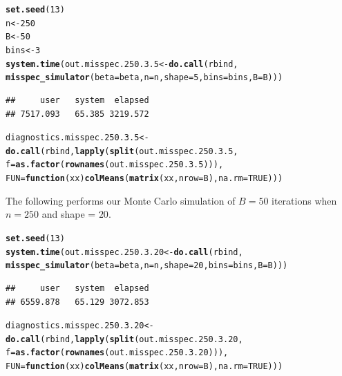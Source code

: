 \documentclass[11pt]{article}\usepackage[]{graphicx}\usepackage[]{color}
\makeatletter
\newcommand{\hlnum}[1]{\textcolor[rgb]{0.686,0.059,0.569}{#1}}%
\newcommand{\hlstd}[1]{\textcolor[rgb]{0.345,0.345,0.345}{#1}}%
\newcommand{\hlkwa}[1]{\textcolor[rgb]{0.161,0.373,0.58}{\textbf{#1}}}%
\newcommand{\hlkwb}[1]{\textcolor[rgb]{0.69,0.353,0.396}{#1}}%
\newcommand{\hlkwc}[1]{\textcolor[rgb]{0.333,0.667,0.333}{#1}}%
\newcommand{\hlkwd}[1]{\textcolor[rgb]{0.737,0.353,0.396}{\textbf{#1}}}%
\newenvironment{kframe}{%
 \def\at@end@of@kframe{}%
 \ifinner\ifhmode%
  \def\at@end@of@kframe{\end{minipage}}%
  \begin{minipage}{\columnwidth}%
 \fi\fi%
 \def\FrameCommand##1{\hskip\@totalleftmargin \hskip-\fboxsep
 \colorbox{shadecolor}{##1}\hskip-\fboxsep
     \hskip-\linewidth \hskip-\@totalleftmargin \hskip\columnwidth}%
 \MakeFramed {\advance\hsize-\width
   \@totalleftmargin\z@ \linewidth\hsize
   \@setminipage}}%
 {\par\unskip\endMakeFramed%
 \at@end@of@kframe}
\newenvironment{knitrout}{}{} %
\makeatother
\begin{document}
\begin{knitrout}
\color{fgcolor}\begin{kframe}
\begin{alltt}
\hlkwd{set.seed}\hlstd{(}\hlnum{13}\hlstd{)}
\hlstd{n} \hlkwb{<-} \hlnum{250}
\hlstd{B} \hlkwb{<-} \hlnum{50}
\hlstd{bins} \hlkwb{<-} \hlnum{3}
\hlkwd{system.time}\hlstd{(out.misspec.250.3.5} \hlkwb{<-} \hlkwd{do.call}\hlstd{(rbind,}
  \hlkwd{misspec_simulator}\hlstd{(}\hlkwc{beta} \hlstd{= beta,} \hlkwc{n} \hlstd{= n,} \hlkwc{shape} \hlstd{=} \hlnum{5}\hlstd{,} \hlkwc{bins} \hlstd{= bins,} \hlkwc{B} \hlstd{= B)))}
\end{alltt}
\begin{verbatim}
##     user   system  elapsed 
## 7517.093   65.385 3219.572
\end{verbatim}
\begin{alltt}
\hlstd{diagnostics.misspec.250.3.5} \hlkwb{<-} \hlkwd{do.call}\hlstd{(rbind,} \hlkwd{lapply}\hlstd{(}\hlkwd{split}\hlstd{(out.misspec.250.3.5,}
  \hlkwc{f} \hlstd{=} \hlkwd{as.factor}\hlstd{(}\hlkwd{rownames}\hlstd{(out.misspec.250.3.5))),}
  \hlkwc{FUN} \hlstd{=} \hlkwa{function}\hlstd{(}\hlkwc{xx}\hlstd{)} \hlkwd{colMeans}\hlstd{(}\hlkwd{matrix}\hlstd{(xx,} \hlkwc{nrow} \hlstd{= B),} \hlkwc{na.rm} \hlstd{=} \hlnum{TRUE}\hlstd{)))}
\end{alltt}
\end{kframe}
\end{knitrout}


The following performs our Monte Carlo simulation of $B = 50$ iterations 
when $n = 250$ and shape = $20$.

\begin{knitrout}
\color{fgcolor}\begin{kframe}
\begin{alltt}
\hlkwd{set.seed}\hlstd{(}\hlnum{13}\hlstd{)}
\hlkwd{system.time}\hlstd{(out.misspec.250.3.20} \hlkwb{<-} \hlkwd{do.call}\hlstd{(rbind,}
  \hlkwd{misspec_simulator}\hlstd{(}\hlkwc{beta} \hlstd{= beta,} \hlkwc{n} \hlstd{= n,} \hlkwc{shape} \hlstd{=} \hlnum{20}\hlstd{,} \hlkwc{bins} \hlstd{= bins,} \hlkwc{B} \hlstd{= B)))}
\end{alltt}
\begin{verbatim}
##     user   system  elapsed 
## 6559.878   65.129 3072.853
\end{verbatim}
\begin{alltt}
\hlstd{diagnostics.misspec.250.3.20} \hlkwb{<-} \hlkwd{do.call}\hlstd{(rbind,} \hlkwd{lapply}\hlstd{(}\hlkwd{split}\hlstd{(out.misspec.250.3.20,}
  \hlkwc{f} \hlstd{=} \hlkwd{as.factor}\hlstd{(}\hlkwd{rownames}\hlstd{(out.misspec.250.3.20))),}
  \hlkwc{FUN} \hlstd{=} \hlkwa{function}\hlstd{(}\hlkwc{xx}\hlstd{)} \hlkwd{colMeans}\hlstd{(}\hlkwd{matrix}\hlstd{(xx,} \hlkwc{nrow} \hlstd{= B),} \hlkwc{na.rm} \hlstd{=} \hlnum{TRUE}\hlstd{)))}
\end{alltt}
\end{kframe}
\end{knitrout}
\end{document}
